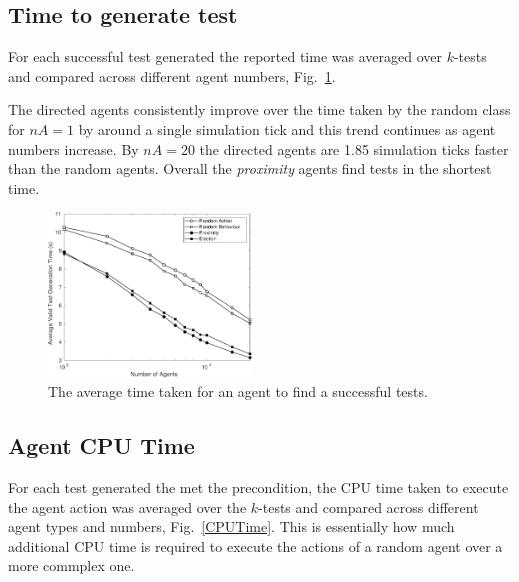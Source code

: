 \documentclass[letterpaper, 10 pt, journal, twoside]{IEEEtran}
\begin{document}
\subsection{Time to generate test}
For each successful test generated the reported time was averaged over $k$-tests and compared across different agent numbers, Fig.~\ref{Time}. 

The directed agents consistently improve over the time taken by the random class for $nA=1$ by around a single simulation tick and this trend continues as agent numbers increase. By $nA=20$ the directed agents are 1.85 simulation ticks faster than the random agents. Overall the \textit{proximity} agents find tests in the shortest time.

\begin{figure}[!t]
	\centering
\includegraphics[width=0.48\textwidth]{Time.pdf}
	\caption{The average time taken for an agent to find a successful tests.}
	\label{Time}
\end{figure}


\subsection{Agent CPU Time}
For each test generated the met the precondition, the CPU time taken to execute the agent action was averaged over the $k$-tests and compared across different agent types and numbers, Fig.~\ref{CPUTime}. This is essentially how much additional CPU time is required to execute the actions of a random agent over a more commplex one.
\end{document}
